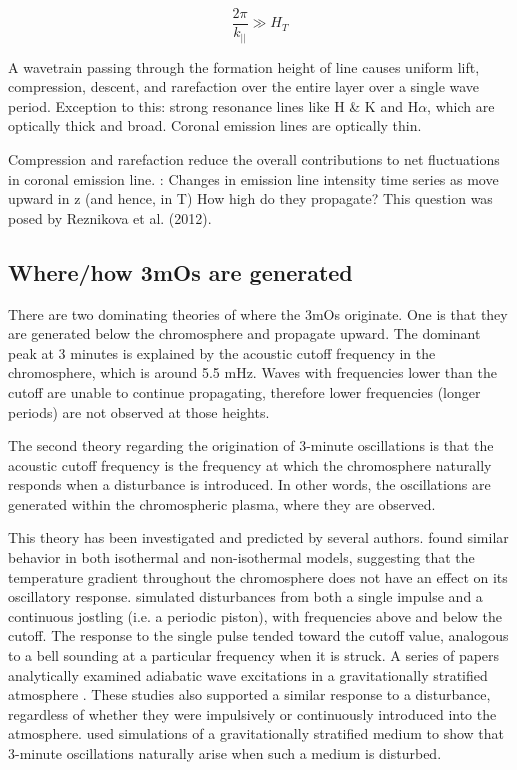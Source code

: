     \begin{equation}
        \frac{2\pi}{k_{||}} \gg H_{T}
    \end{equation}

A wavetrain passing through the formation height of line causes uniform lift,
compression, descent, and rarefaction over the entire layer over a single wave
period. Exception to this: strong resonance lines like
 H \& K and H$\alpha$, which
are optically thick and broad.
Coronal emission lines are optically thin.

Compression and rarefaction reduce the overall contributions to net
fluctuations in coronal emission line.
:
Changes in emission line intensity time series as move upward in z
(and hence, in T)
How high do they propagate? This question was posed by Reznikova et al. (2012).



\subsection{Where/how 3mOs are generated}

There are two dominating theories of where the 3mOs originate.
One is that they are generated below the chromosphere and
propagate upward. The dominant peak at 3 minutes is explained by
the acoustic cutoff frequency in the chromosphere, which is around
5.5 mHz.
Waves with frequencies lower than the cutoff are unable to continue
propagating, therefore lower frequencies (longer periods) are not
observed at those heights.

The second theory regarding the origination of 3-minute oscillations
is that the acoustic cutoff frequency is the frequency at which the
chromosphere naturally responds when a disturbance is introduced.
In other words, the oscillations are
generated within the chromospheric plasma, where they are observed.

This theory has been investigated and predicted by several authors.
\cite{Fleck1991} found similar behavior in
both isothermal and non-isothermal models, suggesting that the temperature
gradient throughout the chromosphere does not have an effect on its oscillatory
response. \cite{Kalkofen1994} simulated disturbances from both a single impulse
and a continuous jostling (i.e. a periodic piston), with frequencies above and
below the cutoff. The response to the single pulse tended toward the cutoff
value, analogous to a bell sounding at a particular frequency when it is
struck. A series of papers analytically examined adiabatic wave excitations in
a gravitationally stratified atmosphere \citep{Sutmann1995a, Sutmann1995b,
Sutmann1998}. These studies also supported a similar response to a disturbance,
regardless of whether they were impulsively or continuously introduced into the
atmosphere. \cite{Chae2015} used simulations of a gravitationally stratified
medium to show that 3-minute oscillations naturally arise when such a medium is
disturbed.

